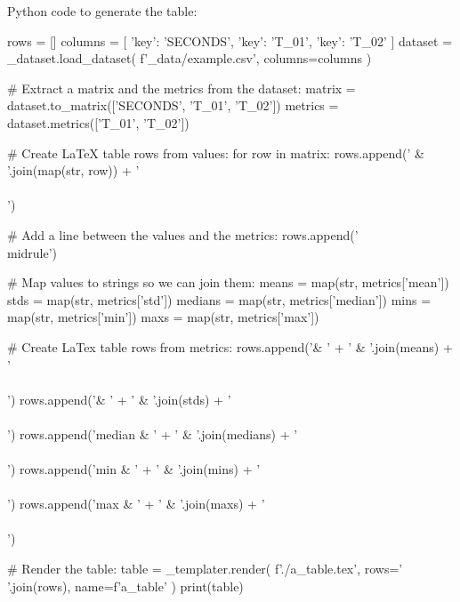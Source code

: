 \documentclass[a4paper]{book}
\begin{document}
Python code to generate the table:
\begin{python}
rows = []
columns = [
    {'key': 'SECONDS'},
    {'key': 'T_01'},
    {'key': 'T_02'}
]
dataset = _dataset.load_dataset(
    f'{_data}/example.csv', 
    columns=columns
)

# Extract a matrix and the metrics from the dataset:
matrix = dataset.to_matrix(['SECONDS', 'T_01', 'T_02'])
metrics = dataset.metrics(['T_01', 'T_02'])

# Create LaTeX table rows from values:
for row in matrix:
    rows.append(' & '.join(map(str, row)) + ' \\\\')

# Add a line between the values and the metrics:
rows.append('\\midrule')

# Map values to strings so we can join them:
means   = map(str, metrics['mean'])
stds    = map(str, metrics['std'])
medians = map(str, metrics['median'])
mins    = map(str, metrics['min'])
maxs    = map(str, metrics['max'])

# Create LaTex table rows from metrics:
rows.append('\mu & '    + ' & '.join(means)   + ' \\\\')
rows.append('\sigma & ' + ' & '.join(stds)    + ' \\\\')
rows.append('median & ' + ' & '.join(medians) + ' \\\\')
rows.append('min & '    + ' & '.join(mins)    + ' \\\\')
rows.append('max & '    + ' & '.join(maxs)    + ' \\\\')

# Render the table:
table = _templater.render(
    f'./a_table.tex',
    rows=' \n'.join(rows),
    name=f'a_table'
)
print(table)

\end{python}
\end{document}
